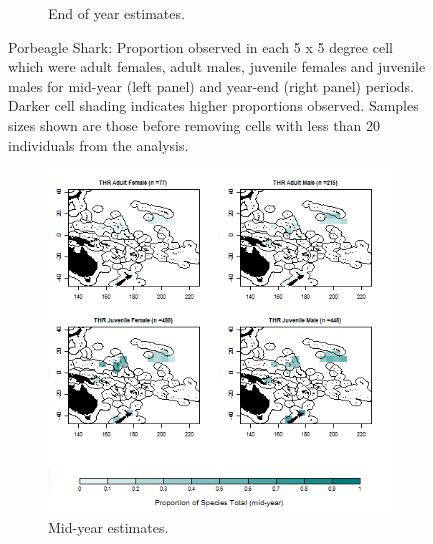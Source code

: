 \documentclass[12pt]{SCreport}
\begin{document}
\begin{landscape}
\begin{figure}
\begin{subfigure}[b]{0.6\textwidth}
       \caption{End of year estimates.}
       \label{fig:BI_29}
   \end{subfigure}
\caption{Porbeagle Shark: Proportion observed in each 5 x 5 degree cell which were adult females, adult males, juvenile females and juvenile males for mid-year (left panel) and year-end (right panel) periods. Darker cell shading indicates higher proportions observed. Samples sizes shown are those before removing cells with less than 20 individuals from the analysis. }
\label{BI_M06} 
\end{figure}
\end{landscape}

\begin{landscape}
\begin{figure}
\centering
   \begin{subfigure}[b]{0.6\textwidth}
       \includegraphics[width=\textwidth]{../GRAPHICS/Defined/BI_32_Map_maturity_sex_THR_MY}
       \caption{Mid-year estimates.}
       \label{fig:BI_32}
   \end{subfigure}
   \begin{subfigure}[b]{0.6\textwidth}

\end{subfigure}
\end{figure}
\end{landscape}
\end{document}

